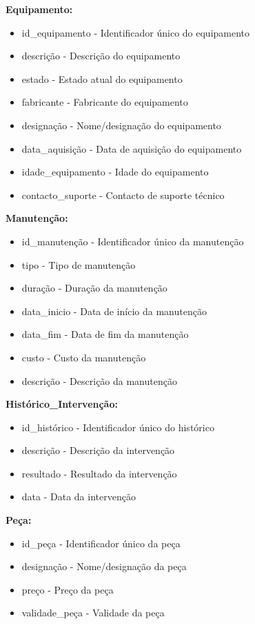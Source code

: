 \textbf{Equipamento:}
\begin{itemize}
    \item id\_equipamento - Identificador único do equipamento
    \item descrição - Descrição do equipamento
    \item estado - Estado atual do equipamento
    \item fabricante - Fabricante do equipamento
    \item designação - Nome/designação do equipamento
    \item data\_aquisição - Data de aquisição do equipamento
    \item idade\_equipamento - Idade do equipamento
    \item contacto\_suporte - Contacto de suporte técnico
\end{itemize}

\textbf{Manutenção:}
\begin{itemize}
    \item id\_manutenção - Identificador único da manutenção
    \item tipo - Tipo de manutenção
    \item duração - Duração da manutenção
    \item data\_inicio - Data de início da manutenção
    \item data\_fim - Data de fim da manutenção
    \item custo - Custo da manutenção
    \item descrição - Descrição da manutenção
\end{itemize}

\textbf{Histórico\_Intervenção:}
\begin{itemize}
    \item id\_histórico - Identificador único do histórico
    \item descrição - Descrição da intervenção
    \item resultado - Resultado da intervenção
    \item data - Data da intervenção
\end{itemize}

\textbf{Peça:}
\begin{itemize}
    \item id\_peça - Identificador único da peça
    \item designação - Nome/designação da peça
    \item preço - Preço da peça
    \item validade\_peça - Validade da peça
\end{itemize}

